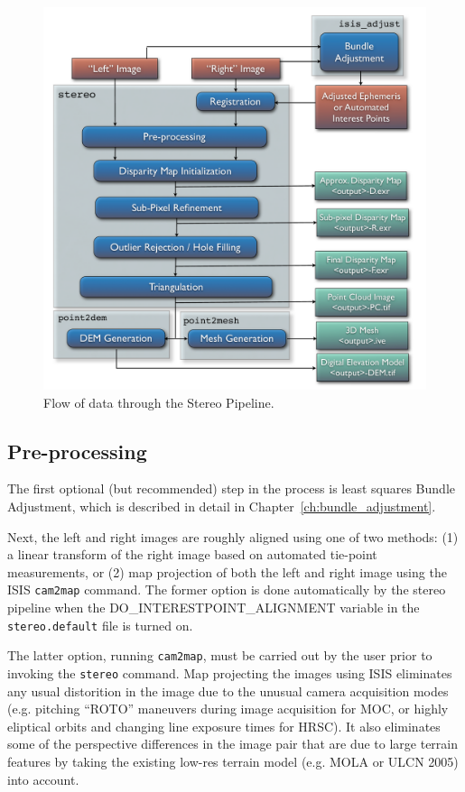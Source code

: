 \begin{figure}[tb]
  \centering
  \includegraphics[width=13cm]{images/asp}
  \caption{Flow of data through the Stereo Pipeline.}
  \label{fig:asp}
\end{figure}

\subsection{Pre-processing}

The first optional (but recommended) step in the process is least
squares Bundle Adjustment, which is described in detail in
Chapter~\ref{ch:bundle_adjustment}. 

Next, the left and right images are roughly aligned using one of two
methods: (1) a linear transform of the right image based on automated
tie-point measurements, or (2) map projection of both the left and
right image using the ISIS {\tt cam2map} command.  The former option
is done automatically by the stereo pipeline when the
DO\_INTERESTPOINT\_ALIGNMENT variable in the {\tt stereo.default} file
is turned on.  

The latter option, running {\tt cam2map}, must be carried out by the
user prior to invoking the {\tt stereo} command.  Map projecting the
images using ISIS eliminates any usual distorition in the image due to
the unusual camera acquisition modes (e.g. pitching ``ROTO'' maneuvers
during image acquisition for MOC, or highly eliptical orbits and
changing line exposure times for HRSC).  It also eliminates some of
the perspective differences in the image pair that are due to large
terrain features by taking the existing low-res terrain model
(e.g. MOLA or ULCN 2005) into account.  


